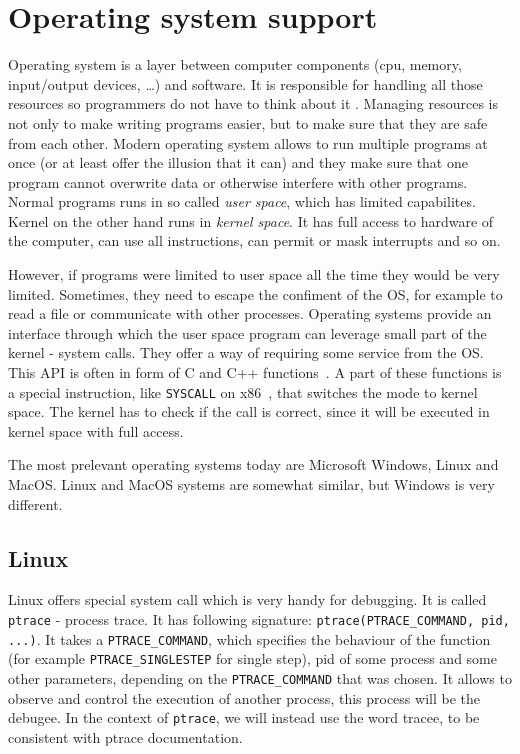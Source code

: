 \section{Operating system support}
Operating system is a layer between computer components (cpu, memory, input/output devices, \dots) and software. It is responsible for
handling all those resources so programmers do not have to think about it \cite{modern-os, os-concepts}. Managing resources is not only to make writing programs easier, but to make sure that they are
safe from each other. Modern operating system allows to run multiple programs at once (or at least offer the illusion that it can) and they make sure that
one program cannot overwrite data or otherwise interfere with other programs. Normal programs runs in so called \textit{user space}, which has limited capabilites.
Kernel on the other hand runs in \textit{kernel space}. It has full access to hardware of the computer, can use all instructions, can permit or mask interrupts and so on.

However, if programs were limited to user space all the time they would be very limited.
Sometimes, they need to escape the confiment of the OS, for example to read a file or communicate with other processes.
Operating systems provide an interface through which the user space program
can leverage small part of the kernel - system calls. They offer a way of requiring some service from the OS.
This API is often in form of C and C++ functions~\cite{os-concepts}. A part of these functions is a special instruction, like \texttt{SYSCALL} on x86~\cite{intel-manual}, that
switches the mode to kernel space. The kernel has to check if the call is correct, since it will
be executed in kernel space with full access.

The most prelevant operating systems today are Microsoft Windows, Linux and MacOS.
Linux and MacOS systems are somewhat similar, but Windows is very different.

\subsection{Linux}
Linux offers special system call which is very handy for debugging. It is called \texttt{ptrace} \cite{ptrace} - process
trace. It has following signature: \texttt{ptrace(PTRACE\_COMMAND, pid, ...)}. It takes a \texttt{PTRACE\_COMMAND},
which specifies the behaviour of the function (for example \texttt{PTRACE\_SINGLESTEP} for single step), pid of some
process and some other parameters, depending on the \texttt{PTRACE\_COMMAND} that was chosen.
It allows to observe and control the execution of another process, this process will be the debugee.
In the context of \texttt{ptrace}, we will instead use the word tracee, to be consistent with ptrace documentation.


